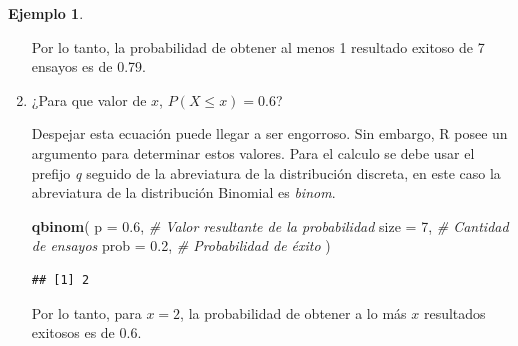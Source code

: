 \documentclass[
  11pt,
]{book}
\newenvironment{Shaded}{\begin{snugshade}}{\end{snugshade}}
\newcommand{\AttributeTok}[1]{\textcolor[rgb]{0.13,0.29,0.53}{#1}}
\newcommand{\CommentTok}[1]{\textcolor[rgb]{0.56,0.35,0.01}{\textit{#1}}}
\newcommand{\DecValTok}[1]{\textcolor[rgb]{0.00,0.00,0.81}{#1}}
\newcommand{\FloatTok}[1]{\textcolor[rgb]{0.00,0.00,0.81}{#1}}
\newcommand{\FunctionTok}[1]{\textcolor[rgb]{0.13,0.29,0.53}{\textbf{#1}}}
\newcommand{\NormalTok}[1]{#1}
\theoremstyle{definition}
\theoremstyle{definition}
\newtheorem{example}{Ejemplo}[chapter]
\theoremstyle{definition}
\theoremstyle{definition}
\theoremstyle{remark}
\begin{document}
\begin{example}
\begin{enumerate}
  Por lo tanto, la probabilidad de obtener al menos 1 resultado exitoso de 7 ensayos es de 0.79.
\item
  ¿Para que valor de \(x\), \(P(X \leq x) = 0.6\)?

  Despejar esta ecuación puede llegar a ser engorroso. Sin embargo, R posee un argumento para determinar estos valores. Para el calculo se debe usar el prefijo \emph{q} seguido de la abreviatura de la distribución discreta, en este caso la abreviatura de la distribución Binomial es \emph{binom}.

\begin{Shaded}
\begin{Highlighting}[]
\FunctionTok{qbinom}\NormalTok{(}
  \AttributeTok{p =} \FloatTok{0.6}\NormalTok{, }\CommentTok{\# Valor resultante de la probabilidad}
  \AttributeTok{size =} \DecValTok{7}\NormalTok{, }\CommentTok{\# Cantidad de ensayos}
  \AttributeTok{prob =} \FloatTok{0.2}\NormalTok{, }\CommentTok{\# Probabilidad de éxito}
\NormalTok{  )}
\end{Highlighting}
\end{Shaded}

\begin{verbatim}
## [1] 2
\end{verbatim}

  Por lo tanto, para \(x = 2\), la probabilidad de obtener a lo más \(x\) resultados exitosos es de 0.6.
\end{enumerate}

\end{example}
\end{document}

